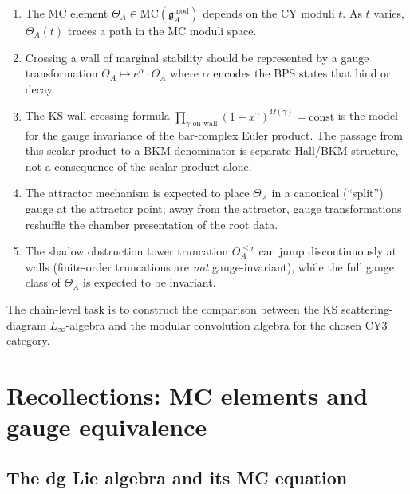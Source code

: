 \documentclass[11pt]{article}
\theoremstyle{definition}
\theoremstyle{remark}
\newcommand{\frakg}{\mathfrak{g}}
\newcommand{\Linf}{L_\infty}
\newcommand{\MC}{\mathrm{MC}}
\begin{document}
\begin{enumerate}[label=(\arabic*)]
\item The MC element $\Theta_A \in \MC(\frakg^{\mathrm{mod}}_A)$ depends on
 the CY moduli $t$. As $t$ varies, $\Theta_A(t)$ traces a path in the MC
 moduli space.

\item Crossing a wall of marginal stability should be represented by a
 gauge transformation
 $\Theta_A \mapsto e^{\alpha} \cdot \Theta_A$ where $\alpha$ encodes the
 BPS states that bind or decay.

\item The KS wall-crossing formula
 $\prod_{\gamma \text{ on wall}} (1 - x^\gamma)^{\Omega(\gamma)} = \text{const}$
 is the model for the gauge invariance of the bar-complex Euler product.
 The passage from this scalar product to a BKM denominator is separate
 Hall/BKM structure, not a consequence of the scalar product alone.

\item The attractor mechanism is expected to place $\Theta_A$ in a canonical
 (``split'') gauge at the attractor point; away from the attractor, gauge
 transformations reshuffle the chamber presentation of the root data.

\item The shadow obstruction tower truncation $\Theta^{\leq r}_A$ can jump
 discontinuously at walls (finite-order truncations are \emph{not}
 gauge-invariant), while the full gauge class of $\Theta_A$ is expected
 to be invariant.
\end{enumerate}

The chain-level task is to construct the comparison between the KS
scattering-diagram $\Linf$-algebra and the modular convolution algebra for
the chosen CY3 category.

\section{Recollections: MC elements and gauge equivalence}
\label{sec:wc-mc-recollections}

\subsection{The dg Lie algebra and its MC equation}
\label{ssec:dgla-mc}
\end{document}
